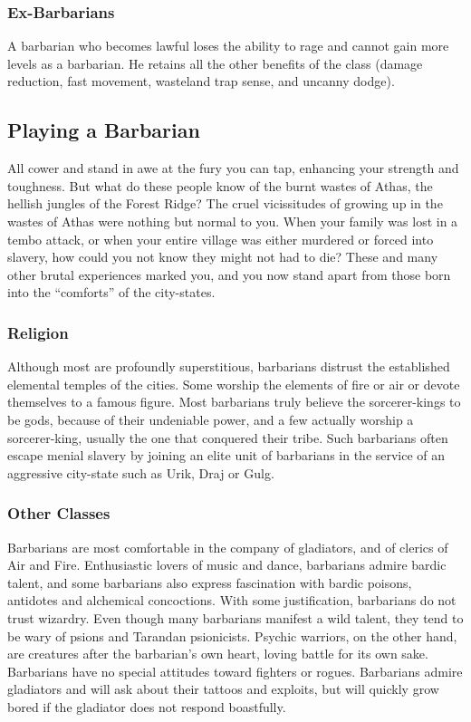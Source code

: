 \subsubsection{Ex-Barbarians}

A barbarian who becomes lawful loses the ability to rage and cannot gain more levels as a barbarian. He retains all the other benefits of the class (damage reduction, fast movement, wasteland trap sense, and uncanny dodge).

\subsection{Playing a Barbarian}

All cower and stand in awe at the fury you can tap, enhancing your strength and toughness. But what do these people know of the burnt wastes of Athas, the hellish jungles of the Forest Ridge? The cruel vicissitudes of growing up in the wastes of Athas were nothing but normal to you. When your family was lost in a tembo attack, or when your entire village was either murdered or forced into slavery, how could you not know they might not had to die? These and many other brutal experiences marked you, and you now stand apart from those born into the ``comforts'' of the city-states.

\subsubsection{Religion}

Although most are profoundly superstitious, barbarians distrust the established elemental temples of the cities. Some worship the elements of fire or air or devote themselves to a famous figure. Most barbarians truly believe the sorcerer-kings to be gods, because of their undeniable power, and a few actually worship a sorcerer-king, usually the one that conquered their tribe. Such barbarians often escape menial slavery by joining an elite unit of barbarians in the service of an aggressive city-state such as Urik, Draj or Gulg.

\subsubsection{Other Classes}

Barbarians are most comfortable in the company of gladiators, and of clerics of Air and Fire. Enthusiastic lovers of music and dance, barbarians admire bardic talent, and some barbarians also express fascination with bardic poisons, antidotes and alchemical concoctions. With some justification, barbarians do not trust wizardry. Even though many barbarians manifest a wild talent, they tend to be wary of psions and Tarandan psionicists. Psychic warriors, on the other hand, are creatures after the barbarian's own heart, loving battle for its own sake. Barbarians have no special attitudes toward fighters or rogues. Barbarians admire gladiators and will ask about their tattoos and exploits, but will quickly grow bored if the gladiator does not respond boastfully.

